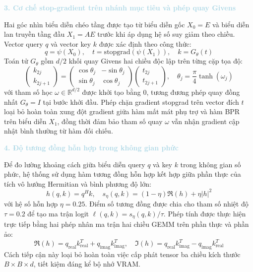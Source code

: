 \noindent\textcolor{lightblue}{\textbf{3. Cơ chế stop-gradient trên nhánh mục tiêu và phép quay Givens}}

Hai góc nhìn biểu diễn chéo tầng được tạo từ biểu diễn gốc $X_0 = E$ và biểu diễn lan truyền tầng đầu $X_1 = A E$ trước khi áp dụng hệ số suy giảm theo chiều. Vector query $q$ và vector key $k$ được xác định theo công thức:
\begin{equation}
q = \psi(X_0), \quad t = \text{stopgrad}(\psi(X_1)), \quad k = G_\theta(t)
\end{equation}
Toán tử $G_\theta$ gồm $d/2$ khối quay Givens hai chiều độc lập trên từng cặp tọa độ:
\begin{equation}
\begin{pmatrix} k_{2j} \\ k_{2j+1} \end{pmatrix} = \begin{pmatrix} \cos\theta_j & -\sin\theta_j \\ \sin\theta_j & \cos\theta_j \end{pmatrix} \begin{pmatrix} t_{2j} \\ t_{2j+1} \end{pmatrix}, \quad \theta_j = \frac{\pi}{4}\tanh(\omega_j)
\end{equation}
với tham số học $\omega \in \mathbb{R}^{d/2}$ được khởi tạo bằng 0, tương đương phép quay đồng nhất $G_\theta = I$ tại bước khởi đầu. Phép chặn gradient stopgrad trên vector đích $t$ loại bỏ hoàn toàn xung đột gradient giữa hàm mất mát phụ trợ và hàm BPR trên biểu diễn $X_1$, đồng thời đảm bảo tham số quay $\omega$ vẫn nhận gradient cập nhật bình thường từ hàm đối chiếu.

\noindent\textcolor{lightblue}{\textbf{4. Độ tương đồng hỗn hợp trong không gian phức}}

Để đo lường khoảng cách giữa biểu diễn query $q$ và key $k$ trong không gian số phức, hệ thống sử dụng hàm tương đồng hỗn hợp kết hợp giữa phần thực của tích vô hướng Hermitian và bình phương độ lớn:
\begin{equation}
h(q,k) = q^H k, \quad s_\eta(q,k) = (1 - \eta)\Re(h) + \eta|h|^2
\end{equation}
với hệ số hỗn hợp $\eta = 0.25$. Điểm số tương đồng được chia cho tham số nhiệt độ $\tau = 0.2$ để tạo ma trận logit $\ell(q,k) = s_\eta(q,k) / \tau$. Phép tính được thực hiện trực tiếp bằng hai phép nhân ma trận hai chiều GEMM trên phần thực và phần ảo:
\begin{equation}
\Re(h) = q_{\text{real}} k_{\text{real}}^T + q_{\text{imag}} k_{\text{imag}}^T, \quad \Im(h) = q_{\text{real}} k_{\text{imag}}^T - q_{\text{imag}} k_{\text{real}}^T
\end{equation}
Cách tiếp cận này loại bỏ hoàn toàn việc cấp phát tensor ba chiều kích thước $B \times B \times d$, tiết kiệm đáng kể bộ nhớ VRAM.

